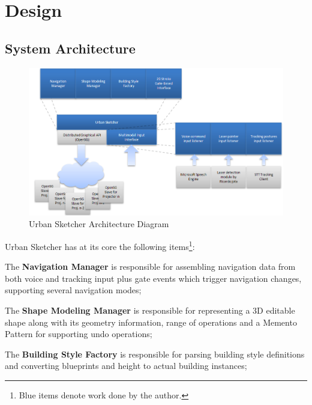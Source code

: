 \chapter{Design}



\section{System Architecture}


\begin{figure}[!ht]
		\centering
		\includegraphics[width=17cm]{gfx/charts/block-diagram.png}
		\caption{Urban Sketcher Architecture Diagram}
		\label{fig:block-diagram}
\end{figure}


Urban Sketcher has at its core the following items\footnote{Blue items denote work done by the author.}:

The \textbf{Navigation Manager} is
		responsible for assembling navigation data from
		both voice and tracking input plus gate events which trigger navigation changes,
		supporting several navigation modes;
	
The \textbf{Shape Modeling Manager} is
		responsible for representing a 3D editable shape
		along with its geometry information, range of operations and a
		Memento Pattern for supporting undo operations;
	
The \textbf{Building Style Factory} is
		responsible for parsing building style definitions
		and converting blueprints and height to actual building instances;
	

